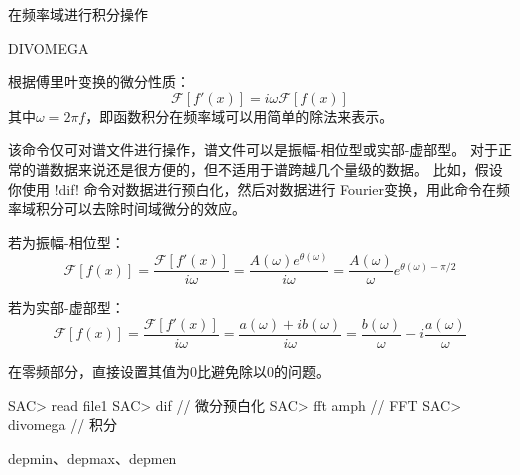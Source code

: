 \label{cmd:divomega}

在频率域进行积分操作

\begin{SACSTX}
DIVOMEGA
\end{SACSTX}

根据傅里叶变换的微分性质：
\[
\mathcal{F}[f'(x)]= i \omega \mathcal{F}[f(x)]
\]
其中$\omega = 2 \pi f $，即函数积分在频率域可以用简单的除法来表示。

该命令仅可对谱文件进行操作，谱文件可以是振幅-相位型或实部-虚部型。
对于正常的谱数据来说还是很方便的，但不适用于谱跨越几个量级的数据。
比如，假设你使用 !dif! 命令对数据进行预白化，然后对数据进行
Fourier变换，用此命令在频率域积分可以去除时间域微分的效应。

若为振幅-相位型：
\[
\mathcal{F}[f(x)] = \frac{\mathcal{F}[f'(x)]}{i \omega}
                  = \frac{A(\omega)e^{\theta(\omega)}}{i \omega}
                  = \frac{A(\omega)}{\omega}e^{\theta(\omega)-\pi/2}
\]

若为实部-虚部型：
\[
\mathcal{F}[f(x)] = \frac{\mathcal{F}[f'(x)]}{i \omega}
                  = \frac{a(\omega)+ib(\omega)}{i \omega}
                  = \frac{b(\omega)}{\omega}-i\frac{a(\omega)}{\omega}
\]

在零频部分，直接设置其值为0比避免除以0的问题。

\begin{SACCode}
SAC> read file1
SAC> dif                // 微分预白化
SAC> fft amph           // FFT
SAC> divomega           // 积分
\end{SACCode}

depmin、depmax、depmen

